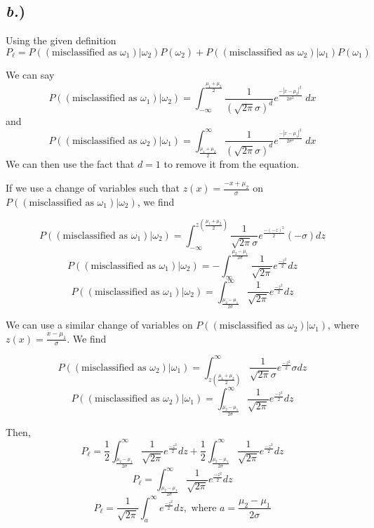 \documentclass{report}
\begin{document}
\subsection*{\textit{b.})}

Using the given definition
$$ P_{\ell} = P((\text{misclassified as }\omega_1)|\omega_2)P(\omega_2) + P((\text{misclassified as }\omega_2)|\omega_1)P(\omega_1)$$

We can say
$$ P((\text{misclassified as }\omega_1)|\omega_2) = \int_{-\infty}^{\frac{\mu_1+\mu_2}{2}}{\frac{1}{(\sqrt{2\pi}\sigma)^d} e^{\frac{-|x-\mu_2|^2}{2\sigma^2}}\;dx} $$
and
$$ P((\text{misclassified as }\omega_2)|\omega_1) = \int_{\frac{\mu_1+\mu_2}{2}}^{\infty}{\frac{1}{(\sqrt{2\pi}\sigma)^d} e^{\frac{-|x-\mu_1|^2}{2\sigma^2}}\;dx} $$
We can then use the fact that $d=1$ to remove it from the equation.

If we use a change of variables such that $z(x) = \frac{-x+\mu_2}{\sigma}$ on $P((\text{misclassified as }\omega_1)|\omega_2)$, we find

$$P((\text{misclassified as }\omega_1)|\omega_2) = \int_{-\infty}^{z\left(\frac{\mu_1+\mu_2}{2}\right)}{\frac{1}{\sqrt{2\pi}\sigma} e^{\frac{-(-z)^2}{2}}(-\sigma) dz} $$
$$P((\text{misclassified as }\omega_1)|\omega_2) = -\int_{\infty}^{\frac{\mu_2-\mu_1}{2\sigma}}{\frac{1}{\sqrt{2\pi}} e^{\frac{-z^2}{2}} dz} $$
$$P((\text{misclassified as }\omega_1)|\omega_2) = \int_{\frac{\mu_2-\mu_1}{2\sigma}}^{\infty}{\frac{1}{\sqrt{2\pi}} e^{\frac{-z^2}{2}} dz} $$

We can use a similar change of variables on $P((\text{misclassified as }\omega_2)|\omega_1)$, where $z(x) = \frac{x-\mu_1}{\sigma}$. We find

$$ P((\text{misclassified as }\omega_2)|\omega_1) = \int_{z\left(\frac{\mu_1+\mu_2}{2}\right)}^{\infty}{\frac{1}{\sqrt{2\pi}\sigma} e^{\frac{-z^2}{2}}\sigma dz} $$
$$ P((\text{misclassified as }\omega_2)|\omega_1) = \int_{\frac{\mu_2-\mu_1}{2\sigma}}^{\infty}{\frac{1}{\sqrt{2\pi}} e^{\frac{-z^2}{2}} dz} $$

Then, 
$$ P_{\ell} = \frac{1}{2}\int_{\frac{\mu_2-\mu_1}{2\sigma}}^{\infty}{\frac{1}{\sqrt{2\pi}} e^{\frac{-z^2}{2}} dz} + \frac{1}{2}\int_{\frac{\mu_2-\mu_1}{2\sigma}}^{\infty}{\frac{1}{\sqrt{2\pi}} e^{\frac{-z^2}{2}} dz} $$
$$ P_{\ell} = \int_{\frac{\mu_2-\mu_1}{2\sigma}}^{\infty}{\frac{1}{\sqrt{2\pi}} e^{\frac{-z^2}{2}} dz} $$
$$ P_{\ell} = \frac{1}{\sqrt{2\pi}}\int_{a}^{\infty}{e^{\frac{-z^2}{2}} dz}, \text{ where } a = \frac{\mu_2-\mu_1}{2\sigma} $$
\end{document}
